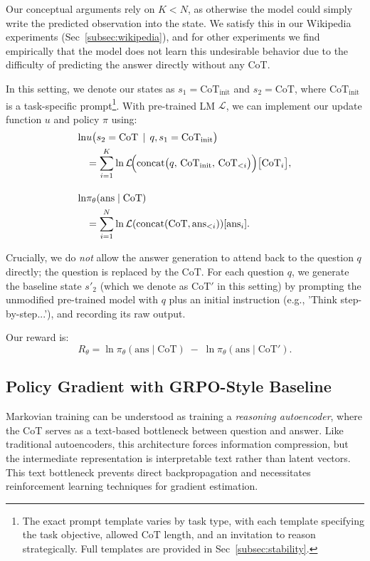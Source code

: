 \documentclass[letterpaper]{article} %
\begin{document}
Our conceptual arguments rely on $K < N$, as otherwise the model could simply write the predicted observation into the state. We satisfy this in our Wikipedia experiments (Sec~\ref{subsec:wikipedia}), and for other experiments we find empirically that the model does not learn this undesirable behavior due to the difficulty of predicting the answer directly without any CoT.

In this setting, we denote our states as $s_1 = \text{CoT}_{\text{init}}$ and $s_2 = \text{CoT}$, where $\text{CoT}_{\text{init}}$ is a task-specific prompt\footnote{The exact prompt template varies by task type, with each template specifying the task objective, allowed $\text{CoT}$ length, and an invitation to reason strategically. Full templates are provided in Sec~\ref{subsec:stability}.}. With pre-trained LM $\mathcal{L}$, we can implement our update function $u$ and policy $\pi$ using:
\begin{align}
\ln & u \bigl(s_2 = \text{CoT} \,\mid\, q, s_1 = \text{CoT}_{\text{init}}\bigr) \\ &= 
\sum_{i=1}^{K}
    \ln \mathcal{L}\!\Bigl(\text{concat}\bigl(q,\,
    \text{CoT}_{\text{init}},\, \text{CoT}_{<i}\bigr)\Bigr)\bigl[\text{CoT}_i\bigr], \\[1em]
\ln & \pi_\theta (\text{ans} \mid \text{CoT}) \\ &=  \sum_{i=1}^{N} \ln \mathcal{L}(\text{concat}(\text{CoT}, \text{ans}_{<i})) [\text{ans}_i].
\end{align}

Crucially, we do \emph{not} allow the answer generation to attend back to the question $q$ directly; the question is replaced by the $\text{CoT}$. For each question $q$, we generate the baseline state $s'_2$ (which we denote as $\text{CoT}'$ in this setting) by prompting the unmodified pre-trained model with $q$ plus an initial instruction (e.g., 'Think step-by-step...'), and recording its raw output.

Our reward is:
\[
R_\theta = \ln \pi_\theta(\text{ans} \mid \text{CoT}) \;-\; \ln \pi_\theta(\text{ans} \mid \text{CoT}').
\]

\subsection{Policy Gradient with GRPO-Style Baseline}
\label{subsec:grpo}

Markovian training can be understood as training a \emph{reasoning autoencoder}, where the CoT serves as a text-based bottleneck between question and answer. Like traditional autoencoders, this architecture forces information compression, but the intermediate representation is interpretable text rather than latent vectors. This text bottleneck prevents direct backpropagation and necessitates reinforcement learning techniques for gradient estimation.
\end{document}
